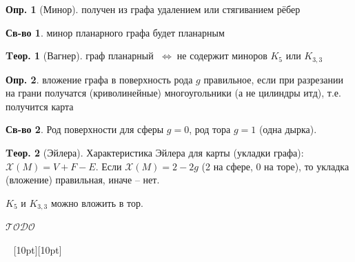 \documentclass[a4paper,12pt]{article}
\numberwithin{figure}{section}
\theoremstyle{definition}
\newtheorem{definition}{Опр.}[section]
\newtheorem*{property}{Св-во}  %
\theoremstyle{definition}
\newtheorem{theorem}{Tеор.}[section]
\def\iiff{$\;\Longleftrightarrow\;$}
\def\iiChi{\mathcal{X}}
\def\iiTODO{\guillemotleft$\mathcal{TODO}$\guillemotright\textellipsis}
\begin{document}
\begin{definition}[Минор]
	получен из графа удалением или стягиванием рёбер
\end{definition}

\begin{property}
	минор планарного графа будет планарным
\end{property}

\begin{theorem}[Вагнер]
	граф планарный \iiff не содержит миноров $K_5$ или $K_{3,3}$
\end{theorem}

\begin{definition}
	вложение графа в поверхность рода $g$ правильное, если при разрезании на грани получатся (криволинейные) многоугольники (а не цилиндры итд), т.е. получится карта
\end{definition}

\begin{property}
	Род поверхности для сферы $g=0$, род тора $g=1$ (одна дырка).
\end{property}

\begin{theorem}[Эйлера]
	Характеристика Эйлера для карты (укладки графа): $\iiChi(M) = V+F-E$.
	Если $\iiChi(M) = 2-2g$ (2 на сфере, 0 на торе), то укладка (вложение) правильная, иначе -- нет. 
\end{theorem}

$K_5$ и $K_{3,3}$ можно вложить в тор.

\iiTODO



\vspace{48pt} \noindent \hrulefill~ \raisebox{-8pt}[10pt][10pt]{\Huge{}}~ \hrulefill
\end{document}
